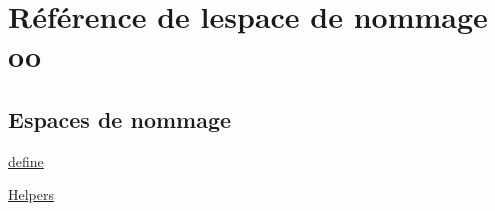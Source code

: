 \hypertarget{namespaceoo}{}\section{Référence de l\textquotesingle{}espace de nommage oo}
\label{namespaceoo}
\subsection*{Espaces de nommage}
\begin{DoxyCompactItemize}
\item 
 \hyperlink{namespaceoo_1_1define}{define}
\item 
 \hyperlink{namespaceoo_1_1_helpers}{Helpers}
\end{DoxyCompactItemize}
